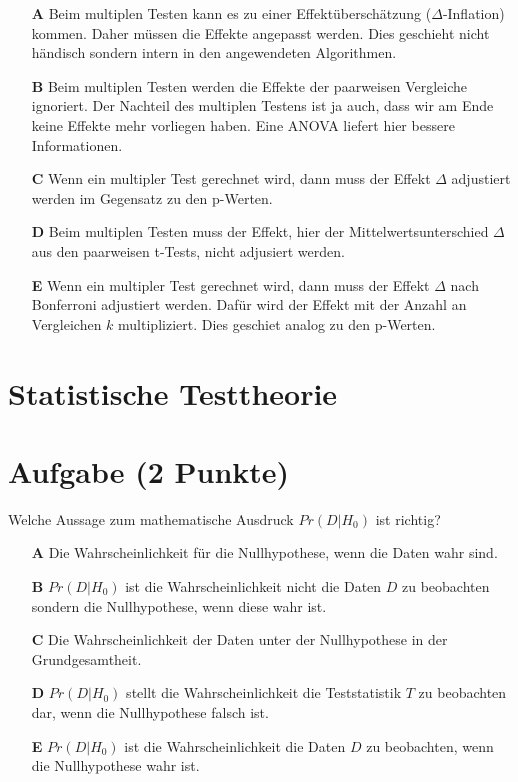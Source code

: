 \documentclass[a4paper, 9pt]{scrartcl}\usepackage[]{graphicx}\usepackage[]{xcolor}
\begin{document}
\begin{enumerate}
\item [\textbf{A} \msquare] Beim multiplen Testen kann es zu einer Effektüberschätzung ($\Delta$-Inflation) kommen. Daher müssen die Effekte angepasst werden. Dies geschieht nicht händisch sondern intern in den angewendeten Algorithmen.
\item [\textbf{B} \msquare] Beim multiplen Testen werden die Effekte der paarweisen Vergleiche ignoriert. Der Nachteil des multiplen Testens ist ja auch, dass wir am Ende keine Effekte mehr vorliegen haben. Eine ANOVA liefert hier bessere Informationen.
\item [\textbf{C} \msquare] Wenn ein multipler Test gerechnet wird, dann muss der Effekt $\Delta$ adjustiert werden im Gegensatz zu den p-Werten.
\item [\textbf{D} \msquare] Beim multiplen Testen muss der Effekt, hier der Mittelwertsunterschied $\Delta$ aus den paarweisen t-Tests, nicht adjusiert werden.
\item [\textbf{E} \msquare] Wenn ein multipler Test gerechnet wird, dann muss der Effekt $\Delta$ nach Bonferroni adjustiert werden. Dafür wird der Effekt mit der Anzahl an Vergleichen $k$ multipliziert. Dies geschiet analog zu den p-Werten.
\end{enumerate}
\section*{Statistische Testtheorie}  

\section{Aufgabe \hfill (2 Punkte)}




Welche Aussage zum mathematische Ausdruck $Pr(D|H_0)$ ist richtig?



\begin{enumerate}
\item [\textbf{A} \msquare] Die Wahrscheinlichkeit für die Nullhypothese, wenn die Daten wahr sind.
\item [\textbf{B} \msquare] $Pr(D|H_0)$ ist die Wahrscheinlichkeit nicht die Daten $D$ zu beobachten sondern die Nullhypothese, wenn diese wahr ist.
\item [\textbf{C} \msquare] Die Wahrscheinlichkeit der Daten unter der Nullhypothese in der Grundgesamtheit.
\item [\textbf{D} \msquare] $Pr(D|H_0)$ stellt die Wahrscheinlichkeit die Teststatistik $T$ zu beobachten dar, wenn die Nullhypothese falsch ist.
\item [\textbf{E} \msquare] $Pr(D|H_0)$ ist die Wahrscheinlichkeit die Daten $D$ zu beobachten, wenn die Nullhypothese wahr ist.
\end{enumerate}
\end{document}
